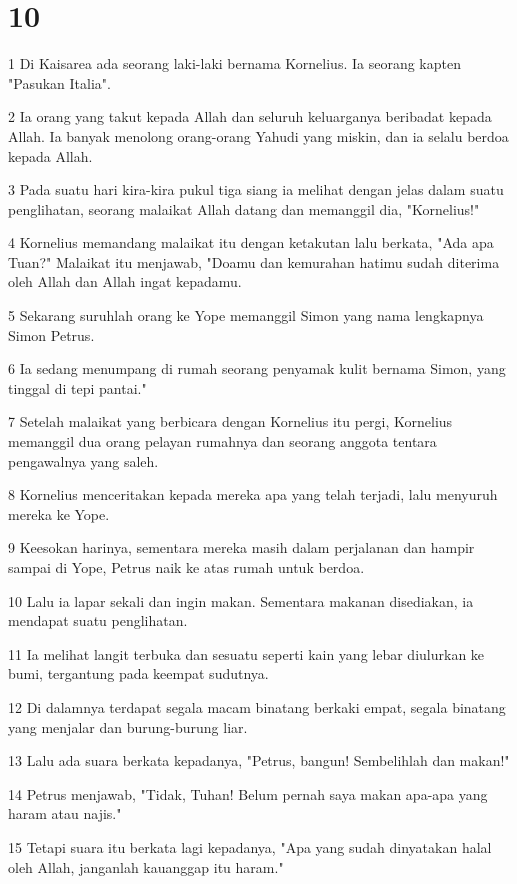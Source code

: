 \chapter{10}

\par 1 Di Kaisarea ada seorang laki-laki bernama Kornelius. Ia seorang kapten "Pasukan Italia".
\par 2 Ia orang yang takut kepada Allah dan seluruh keluarganya beribadat kepada Allah. Ia banyak menolong orang-orang Yahudi yang miskin, dan ia selalu berdoa kepada Allah.
\par 3 Pada suatu hari kira-kira pukul tiga siang ia melihat dengan jelas dalam suatu penglihatan, seorang malaikat Allah datang dan memanggil dia, "Kornelius!"
\par 4 Kornelius memandang malaikat itu dengan ketakutan lalu berkata, "Ada apa Tuan?" Malaikat itu menjawab, "Doamu dan kemurahan hatimu sudah diterima oleh Allah dan Allah ingat kepadamu.
\par 5 Sekarang suruhlah orang ke Yope memanggil Simon yang nama lengkapnya Simon Petrus.
\par 6 Ia sedang menumpang di rumah seorang penyamak kulit bernama Simon, yang tinggal di tepi pantai."
\par 7 Setelah malaikat yang berbicara dengan Kornelius itu pergi, Kornelius memanggil dua orang pelayan rumahnya dan seorang anggota tentara pengawalnya yang saleh.
\par 8 Kornelius menceritakan kepada mereka apa yang telah terjadi, lalu menyuruh mereka ke Yope.
\par 9 Keesokan harinya, sementara mereka masih dalam perjalanan dan hampir sampai di Yope, Petrus naik ke atas rumah untuk berdoa.
\par 10 Lalu ia lapar sekali dan ingin makan. Sementara makanan disediakan, ia mendapat suatu penglihatan.
\par 11 Ia melihat langit terbuka dan sesuatu seperti kain yang lebar diulurkan ke bumi, tergantung pada keempat sudutnya.
\par 12 Di dalamnya terdapat segala macam binatang berkaki empat, segala binatang yang menjalar dan burung-burung liar.
\par 13 Lalu ada suara berkata kepadanya, "Petrus, bangun! Sembelihlah dan makan!"
\par 14 Petrus menjawab, "Tidak, Tuhan! Belum pernah saya makan apa-apa yang haram atau najis."
\par 15 Tetapi suara itu berkata lagi kepadanya, "Apa yang sudah dinyatakan halal oleh Allah, janganlah kauanggap itu haram."
